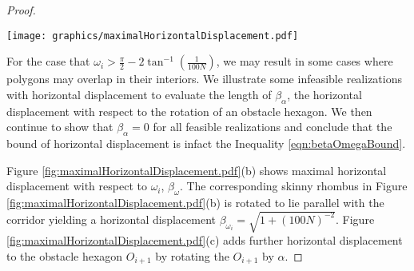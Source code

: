 \documentclass[10pt]{CSUNthesis}
\theoremstyle{plain}%
\theoremstyle{definition}
\theoremstyle{remark}
\newcommand{\lr}[1]{\left( #1 \right)}
\begin{document}
\begin{proof}

\begin{minipage}{\linewidth}
\begin{center}
\texttt{[image: graphics/maximalHorizontalDisplacement.pdf]}
\label{fig:maximalHorizontalDisplacement.pdf}
\end{center}
\end{minipage}

For the case that $\omega_i > \frac{\pi}{2}-2 \tan^{-1} \lr{\frac{1}{100N}}$, we may result in some cases where polygons may overlap in their interiors. 
We illustrate some infeasible realizations with horizontal displacement to evaluate the length of $\beta_\alpha$, the horizontal displacement with respect to the rotation of an obstacle hexagon.  
We then continue to show that $\beta_\alpha = 0$ for all feasible realizations and conclude that the bound of horizontal displacement is infact the Inequality \ref{eqn:betaOmegaBound}. 

Figure \ref{fig:maximalHorizontalDisplacement.pdf}(b) shows maximal horizontal displacement with respect to $\omega_i$, $\beta_\omega$.  
The corresponding skinny rhombus in Figure \ref{fig:maximalHorizontalDisplacement.pdf}(b) is rotated to lie parallel with the corridor yielding a horizontal displacement $\beta_{\omega_i} = \sqrt{1 + \lr{100N}^{-2} }$.  
Figure \ref{fig:maximalHorizontalDisplacement.pdf}(c) adds further horizontal displacement to the obstacle hexagon $O_{i+1}$ by rotating the $O_{i+1}$ by $\alpha$.  


\end{proof}
\end{document}
